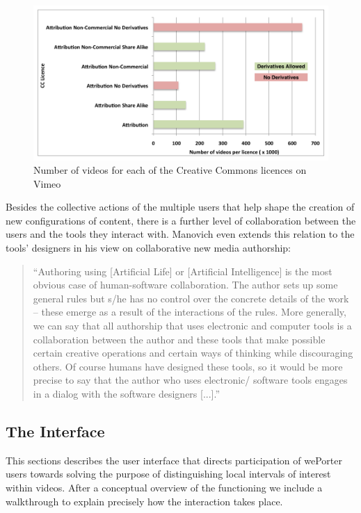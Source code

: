 \begin{figure}[htbp]
  \centering
    \includegraphics[scale=1]{img/vimeoCC}
  \caption{Number of videos for each of the Creative Commons licences on Vimeo}
  \label{fig:vimeoCC}
\end{figure}

Besides the collective actions of the multiple users that help shape the creation of new configurations of content, there is a further level of collaboration between the users and the tools they interact with. Manovich even extends this relation to the tools' designers in his view on collaborative new media authorship:

\begin{quote}
  ``Authoring using [Artificial Life] or [Artificial Intelligence] is the most obvious case of human-software collaboration. The author sets up some general rules but s/he has no control over the concrete details of the work – these emerge as a result of the interactions of the rules. More generally, we can say that all authorship that uses electronic and computer tools is a collaboration between the author and these tools that make possible certain creative operations and certain ways of thinking while discouraging others. Of course humans have designed these tools, so it would be more precise to say that the author who uses electronic/ software tools engages in a dialog with the software designers [...].''\cite{manovichAuthor}
\end{quote}


\subsection{The Interface}
This sections describes the user interface that directs participation of wePorter users towards solving the purpose of distinguishing local intervals of interest within videos. After a conceptual overview of the functioning we include a walkthrough to explain precisely how the interaction takes place.

